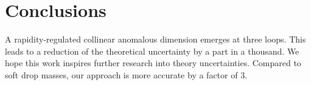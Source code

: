 \section{Conclusions}\label{sec:conclusions}

A rapidity-regulated collinear anomalous dimension emerges at three
loops. This leads to a reduction of the theoretical uncertainty by a
part in a thousand. We hope this work inspires further research into
theory uncertainties. Compared to soft drop masses, our approach is more
accurate by a factor of 3.

